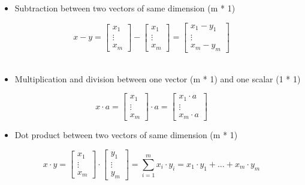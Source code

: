 \documentclass[]{article}
\providecommand{\tightlist}{%
  \setlength{\itemsep}{0pt}\setlength{\parskip}{0pt}}
\begin{document}
\begin{itemize}
\tightlist
\item
  Subtraction between two vectors of same dimension (m * 1)
\end{itemize}

\large

\[
x - y = 
\begin{bmatrix} x_1 \\ \vdots \\ x_m\end{bmatrix} - 
\begin{bmatrix} x_1 \\ \vdots \\ x_m\end{bmatrix} 
= \begin{bmatrix} x_1 - y_1 \\ \vdots \\ x_m - y_m \end{bmatrix}
\] \normalsize ​

\begin{itemize}
\tightlist
\item
  Multiplication and division between one vector (m * 1) and one scalar
  (1 * 1)
\end{itemize}

\large

\[
x \cdot a = \begin{bmatrix} x_1 \\ \vdots \\ x_m\end{bmatrix} 
\cdot a = 
\begin{bmatrix} x_1 \cdot a \\ \vdots \\ x_m \cdot a \end{bmatrix}
\] \normalsize

\begin{itemize}
\tightlist
\item
  Dot product between two vectors of same dimension (m * 1)
\end{itemize}

\large

\[
x \cdot y = \begin{bmatrix} x_1 \\ \vdots \\ x_m\end{bmatrix} 
\cdot 
\begin{bmatrix} y_1 \\ \vdots \\ y_m\end{bmatrix} = 
\sum_{i = 1}^{m} x_i \cdot y_i =  x_1 \cdot y_1 + \dots + x_m \cdot y_m 
\] \normalsize
\end{document}
